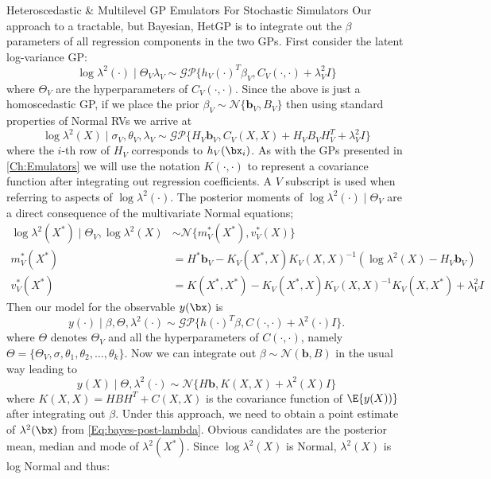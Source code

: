 \begin{chapter}{Heteroscedastic \& Multilevel GP Emulators For Stochastic Simulators\label{Ch:Hetsml}}
Our approach to a tractable, but Bayesian, HetGP is to integrate out the $\beta$ parameters of all regression components in the two GPs. First consider the latent log-variance GP:
\begin{equation}
	\log \lambda^2(\cdot) \mid \Theta_V \lambda_V \sim \mathcal{GP} \{ h_V(\cdot)^T \beta_V , C_V(\cdot, \cdot) + \lambda^2_V I\}
\end{equation}
where $\Theta_V$ are the hyperparameters of $C_V(\cdot, \cdot)$. Since the above is just a homoscedastic GP, if we place the prior $\beta_V \sim \mathcal{N}\{\bm{b}_V, B_V \}$ then using standard properties of Normal RVs we arrive at
\begin{equation}
	\log \lambda^2(X) \mid \sigma_V, \theta_V, \lambda_V \sim \mathcal{GP} \{ H_V \bm{b}_V , C_V(X, X) + H_V B_V H_V^T + \lambda^2_V I\}
\end{equation}
where the $i$-th row of $H_V$ corresponds to $h_V(\bx_i)$. As with the GPs presented in \cref{Ch:Emulators} we will use the notation $K(\cdot, \cdot)$ to represent a covariance function after integrating out regression coefficients. A $V$ subscript is used when referring to aspects of $\log \lambda^2 (\cdot)$. The posterior moments of $\log \lambda^2(\cdot) \mid \Theta_V$ are a direct consequence of the multivariate Normal equations;
\begin{align}
	\log \lambda^2(X^*) \mid \Theta_V, \log \lambda^2(X) &\sim \mathcal{N} \{ m^*_V(X^*), v_V^*(X) \} \label{Eq:bayes-post-lambda} \\
	m_V^*(X^*) &= H^* \bm{b}_V - K_V(X^*, X) K_V(X, X)^{-1} (\log \lambda^2(X) - H_V \bm{b}_V)\\
	v_V^*(X^*) &= K(X^*, X^*) - K_V(X^*, X) K_V(X, X)^{-1} K_V(X, X^*) + \lambda^2_V I
\end{align}
Then our model for the observable $y(\bx)$ is
\begin{equation}
	y(\cdot) \mid \beta, \Theta, \lambda^2(\cdot) \sim \mathcal{GP} \{ h(\cdot)^T \beta, C(\cdot, \cdot) + \lambda^2(\cdot)I \}.
\end{equation}
where $\Theta$ denotes $\Theta_V$ and all the hyperparameters of $C(\cdot, \cdot)$, namely $\Theta = \{\Theta_V, \sigma, \theta_1, \theta_2, \ldots, \theta_k \}$. Now we can integrate out $\beta \sim \mathcal{N}(\bm{b}, B)$ in the usual way leading to
\begin{equation}
	y(X) \mid \Theta, \lambda^2(\cdot) \sim \mathcal{N} \{ H\bm{b}, K(X, X) + \lambda^2(X)I \}
\end{equation}
where $K(X, X) = HBH^T + C(X, X)$ is the covariance function of $\E \{y(X))\}$ after integrating out $\beta$. Under this approach, we need to obtain a point estimate of $\lambda^2(\bx)$ from \cref{Eq:bayes-post-lambda}. Obvious candidates are the posterior mean, median and mode of $\lambda^2(X^*)$. Since $\log \lambda^2(X)$ is Normal, $\lambda^2(X)$ is log Normal and thus:

\end{chapter}
